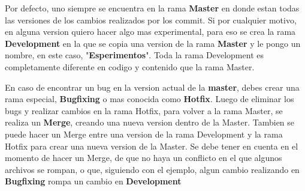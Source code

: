 Por defecto, uno siempre se encuentra en la rama \textbf{Master} en donde estan todas las versiones de los cambios realizados por los commit. Si por cualquier motivo, en alguna version quiero hacer algo mas experimental, para eso se crea la rama \textbf{Development} en la que se copia una version de la rama \textbf{Master} y le pongo un nombre, en este caso, "\textbf{Esperimentos}". Toda la rama Development es completamente diferente en codigo y contenido que la rama Master.

En caso de encontrar un bug en la version actual de la \textbf{master}, debes crear una rama especial, \textbf{Bugfixing} o mas conocida como \textbf{Hotfix}. Luego de eliminar los bugs y realizar cambios en la rama Hotfix, para volver a la rama Master, se realiza un \textbf{Merge}, creando una nueva version dentro de la Master. Tambien se puede hacer un Merge entre una version de la rama Development y la rama Hotfix para crear una nueva version de la Master.
Se debe tener en cuenta en el momento de hacer un Merge, de que no haya un conflicto en el que algunos archivos se rompan, o que, siguiendo con el ejemplo, algun cambio realizando en \textbf{Bugfixing} rompa un cambio en \textbf{Development} 